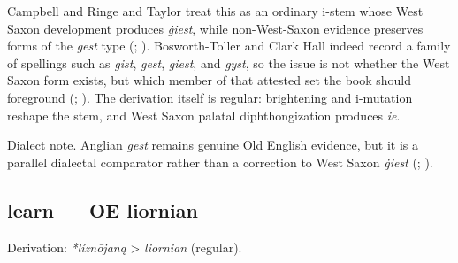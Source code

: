 \documentclass[
  british,
  a4paper,
]{article}
\begin{document}
Campbell and Ringe and Taylor treat this as an ordinary i-stem whose
West Saxon development produces \emph{ġiest}, while non-West-Saxon
evidence preserves forms of the \emph{gest} type
(;
).
Bosworth-Toller and Clark Hall indeed record a family of spellings such
as \emph{gist}, \emph{gest}, \emph{giest}, and \emph{gyst}, so the issue
is not whether the West Saxon form exists, but which member of that
attested set the book should foreground
(;
). The derivation
itself is regular: brightening and i-mutation reshape the stem, and West
Saxon palatal diphthongization produces \emph{ie}.

Dialect note. Anglian \emph{gest} remains genuine Old English evidence,
but it is a parallel dialectal comparator rather than a correction to
West Saxon \emph{ġiest} (; ).

\subsection{learn --- OE liornian}\label{learn-oe-liornian}

Derivation: \emph{*líznōjaną} \textgreater{} \emph{liornian} (regular).

\begingroup
\setlength{\fboxsep}{6pt}
\end{document}
